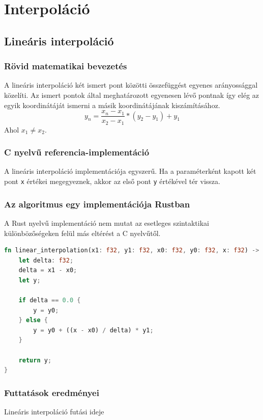 \section{Interpoláció}

\subsection{Lineáris interpoláció}
\subsubsection{Rövid matematikai bevezetés}
A lineáris interpoláció két ismert pont közötti összefüggést egyenes arányossággal közelíti. Az ismert pontok által meghatározott egyenesen lévő pontnak így elég az egyik koordinátáját ismerni a másik koordinátájának kiszámításához.
\[ y_n = \frac{x_n - x_1}{x_2 - x_1} * (y_2 - y_1) + y_1 \]
Ahol $x_1 \neq x_2$.
\subsubsection{C nyelvű referencia-implementáció}
A lineáris interpoláció implementációja egyszerű. Ha a paraméterként kapott két pont \lstinline{x} értékei megegyeznek, akkor az első pont \lstinline{y} értékével tér vissza.
\subsubsection{Az algoritmus egy implementációja Rustban}
A Rust nyelvű implementáció nem mutat az esetleges szintaktikai különbözőségeken felül más eltérést a C nyelvűtől.
\begin{lstlisting}[language=Rust]
fn linear_interpolation(x1: f32, y1: f32, x0: f32, y0: f32, x: f32) -> f32 {
    let delta: f32;
    delta = x1 - x0;
    let y;

    if delta == 0.0 {
        y = y0;
    } else {
        y = y0 + ((x - x0) / delta) * y1;
    }

    return y;
}
\end{lstlisting}
\subsubsection{Futtatások eredményei}
Lineáris interpoláció futási ideje

